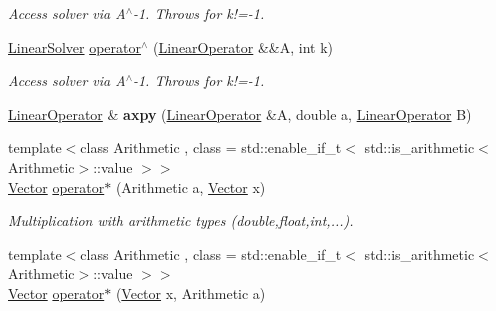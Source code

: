 \begin{DoxyCompactItemize}
\begin{DoxyCompactList}\small\item\em Access solver via A$^\wedge$-\/1. Throws for k!=-\/1. \end{DoxyCompactList}\item 
\hypertarget{namespaceSpacy_a6defec6ee302bf4c1054afc65c9fcb95}{\hyperlink{namespaceSpacy_adcd0d78166a9c972b8a2e5a689fc2d03}{Linear\-Solver} \hyperlink{namespaceSpacy_a6defec6ee302bf4c1054afc65c9fcb95}{operator$^\wedge$} (\hyperlink{classSpacy_1_1LinearOperator}{Linear\-Operator} \&\&A, int k)}\label{namespaceSpacy_a6defec6ee302bf4c1054afc65c9fcb95}

\begin{DoxyCompactList}\small\item\em Access solver via A$^\wedge$-\/1. Throws for k!=-\/1. \end{DoxyCompactList}\item 
\hypertarget{namespaceSpacy_ad08055ec05275c6042d516d4726b5e8f}{\hyperlink{classSpacy_1_1LinearOperator}{Linear\-Operator} \& {\bfseries axpy} (\hyperlink{classSpacy_1_1LinearOperator}{Linear\-Operator} \&A, double a, \hyperlink{classSpacy_1_1LinearOperator}{Linear\-Operator} B)}\label{namespaceSpacy_ad08055ec05275c6042d516d4726b5e8f}

\item 
\hypertarget{namespaceSpacy_ae0a1cbb3d98d6ac0a82727959038f4b4}{{\footnotesize template$<$class Arithmetic , class  = std\-::enable\-\_\-if\-\_\-t$<$ std\-::is\-\_\-arithmetic$<$\-Arithmetic$>$\-::value $>$$>$ }\\\hyperlink{classSpacy_1_1Vector}{Vector} \hyperlink{namespaceSpacy_ae0a1cbb3d98d6ac0a82727959038f4b4}{operator$\ast$} (Arithmetic a, \hyperlink{classSpacy_1_1Vector}{Vector} x)}\label{namespaceSpacy_ae0a1cbb3d98d6ac0a82727959038f4b4}

\begin{DoxyCompactList}\small\item\em Multiplication with arithmetic types (double,float,int,...). \end{DoxyCompactList}\item 
\hypertarget{namespaceSpacy_a0120fd6b1d7580a9f7b8f24e646cbc6c}{{\footnotesize template$<$class Arithmetic , class  = std\-::enable\-\_\-if\-\_\-t$<$ std\-::is\-\_\-arithmetic$<$\-Arithmetic$>$\-::value $>$$>$ }\\\hyperlink{classSpacy_1_1Vector}{Vector} \hyperlink{namespaceSpacy_a0120fd6b1d7580a9f7b8f24e646cbc6c}{operator$\ast$} (\hyperlink{classSpacy_1_1Vector}{Vector} x, Arithmetic a)}\label{namespaceSpacy_a0120fd6b1d7580a9f7b8f24e646cbc6c}


\end{DoxyCompactItemize}
